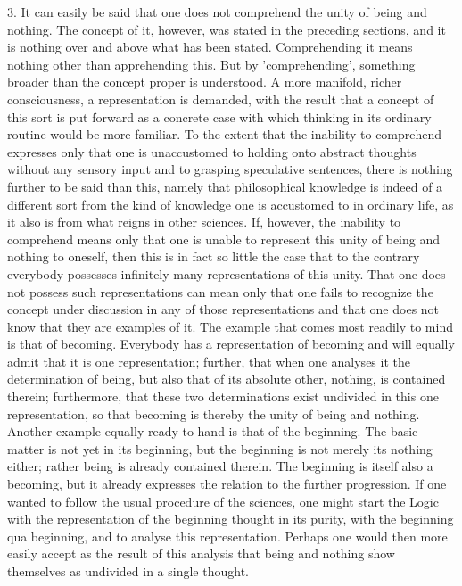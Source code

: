3. It can easily be said that one does not comprehend
the unity of being and nothing.
The concept of it, however, was stated in the preceding sections,
and it is nothing over and above what has been stated.
Comprehending it means nothing other than apprehending this.
But by 'comprehending', something broader than
the concept proper is understood.
A more manifold, richer consciousness,
a representation is demanded,
with the result that a concept of this sort is
put forward as a concrete case with which
thinking in its ordinary routine would be more familiar.
To the extent that the inability to comprehend
expresses only that one is unaccustomed to
holding onto abstract thoughts without any sensory input
and to grasping speculative sentences,
there is nothing further to be said than this,
namely that philosophical knowledge is indeed
of a different sort from the kind of knowledge
one is accustomed to in ordinary life,
as it also is from what reigns in other sciences.
If, however, the inability to comprehend means only
that one is unable to represent this
unity of being and nothing to oneself,
then this is in fact so little the case
that to the contrary everybody possesses
infinitely many representations of this unity.
That one does not possess such representations
can mean only that one fails to recognize the concept
under discussion in any of those representations
and that one does not know that they are examples of it.
The example that comes most readily to mind is that of becoming.
Everybody has a representation of becoming
and will equally admit that it is one representation;
further, that when one analyses it the determination of being,
but also that of its absolute other, nothing, is contained therein;
furthermore, that these two determinations exist undivided in this
one representation, so that becoming is thereby the unity of being and nothing.
Another example equally ready to hand is that of the beginning.
The basic matter is not yet in its beginning,
but the beginning is not merely its nothing either;
rather being is already contained therein.
The beginning is itself also a becoming,
but it already expresses the relation to the further progression.
If one wanted to follow the usual procedure of the sciences,
one might start the Logic with the representation of
the beginning thought in its purity,
with the beginning qua beginning,
and to analyse this representation.
Perhaps one would then more easily accept
as the result of this analysis
that being and nothing show themselves
as undivided in a single thought.

